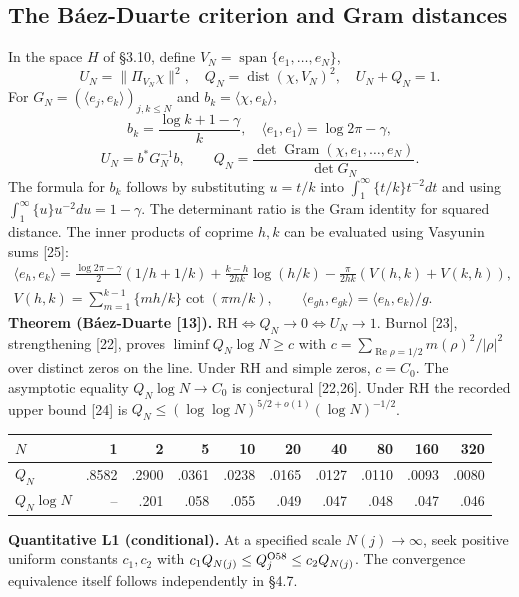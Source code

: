 \documentclass[11pt,a4paper]{article}
\renewcommand{\Re}{\operatorname{Re}}
\DeclareMathOperator{\dist}{dist}
\newcommand{\RH}{\mathrm{RH}}
\begin{document}
\subsection{The Báez-Duarte criterion and Gram distances}
In the space $H$ of §3.10, define $V_N=\operatorname{span}\{e_1,\ldots,e_N\}$,
\[U_N=\|\Pi_{V_N}\chi\|^2,\quad Q_N=\dist(\chi,V_N)^2,\quad U_N+Q_N=1.\]
For $G_N=(\langle e_j,e_k\rangle)_{j,k\le N}$ and $b_k=\langle\chi,e_k\rangle$,
\[b_k=\frac{\log k+1-\gamma}{k},\quad \langle e_1,e_1\rangle=\log2\pi-\gamma,\]
\[U_N=b^*G_N^{-1}b,\qquad Q_N=\frac{\det\operatorname{Gram}(\chi,e_1,\ldots,e_N)}{\det G_N}.\]
The formula for $b_k$ follows by substituting $u=t/k$ into $\int_1^\infty\{t/k\}t^{-2}dt$ and using $\int_1^\infty\{u\}u^{-2}du=1-\gamma$. The determinant ratio is the Gram identity for squared distance. The inner products of coprime $h,k$ can be evaluated using Vasyunin sums [25]:
\begin{gather*}\langle e_h,e_k\rangle=\frac{\log2\pi-\gamma}{2}(1/h+1/k)+\frac{k-h}{2hk}\log(h/k)-\frac{\pi}{2hk}(V(h,k)+V(k,h)),\\ V(h,k)=\sum_{m=1}^{k-1}\{mh/k\}\cot(\pi m/k),\qquad \langle e_{gh},e_{gk}\rangle=\langle e_h,e_k\rangle/g.\end{gather*}
\textbf{Theorem (Báez-Duarte [13]).} $\RH\iff Q_N\to0\iff U_N\to1$.
Burnol [23], strengthening [22], proves $\liminf Q_N\log N\ge c$ with $c=\sum_{\Re\rho=1/2}m(\rho)^2/|\rho|^2$ over distinct zeros on the line. Under RH and simple zeros, $c=C_0$. The asymptotic equality $Q_N\log N\to C_0$ is conjectural [22,26]. Under RH the recorded upper bound [24] is $Q_N\le(\log\log N)^{5/2+o(1)}(\log N)^{-1/2}$.
\begin{center}\small\begin{tabular}{@{}lrrrrrrrrr@{}}\toprule
$N$&1&2&5&10&20&40&80&160&320\\\midrule
$Q_N$&.8582&.2900&.0361&.0238&.0165&.0127&.0110&.0093&.0080\\
$Q_N\log N$&--&.201&.058&.055&.049&.047&.048&.047&.046\\\bottomrule\end{tabular}\end{center}
\textbf{Quantitative L1 (conditional).} At a specified scale $N(j)\to\infty$, seek positive uniform constants $c_1,c_2$ with $c_1Q_{N(j)}\le Q_j^{\rm O58}\le c_2Q_{N(j)}$. The convergence equivalence itself follows independently in §4.7.
\end{document}
